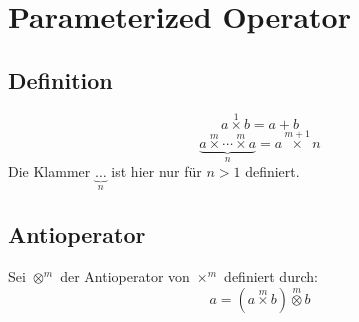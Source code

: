 \documentclass{article}
\begin{document}
\section{Parameterized Operator}
\subsection{Definition}
\[ a \operatorname*{\times}^1 b = a + b \]
\[ \underbrace{a \operatorname*{\times}^m \dotsb \operatorname*{\times}^m a}_n = a\operatorname*{\times}^{m+1}n\]
Die Klammer $\underbrace{\dots}_n$ ist hier nur f\"ur $n > 1$ definiert.
\subsection{Antioperator}
Sei $\operatorname*{\otimes}^m$ der Antioperator von $\operatorname*{\times}^m$ definiert durch:
\[ a = \left(a\operatorname*{\times}^m b\right) \operatorname*{\otimes}^m b \]
\end{document}
